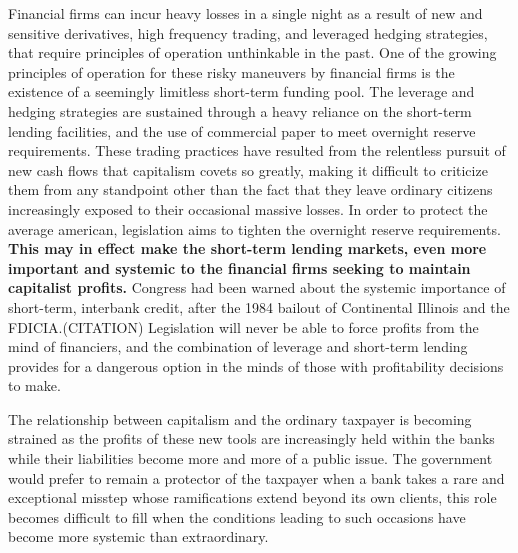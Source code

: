 Financial firms can incur heavy losses in a single night as a result of new and sensitive derivatives, high frequency trading, and leveraged hedging strategies, that require  principles of operation unthinkable in the past.  One of the growing principles of operation for these risky maneuvers by financial firms is the existence of a seemingly limitless short-term funding pool.  The leverage and hedging strategies are sustained through a heavy reliance on the short-term lending facilities, and the use of commercial paper to meet overnight reserve requirements.  These trading practices have resulted from the relentless pursuit of new cash flows that capitalism covets so greatly, making it difficult to criticize them from any standpoint other than the fact that they leave ordinary citizens increasingly exposed to their occasional massive losses.  In order to protect the average american, legislation aims to tighten the overnight reserve requirements.  \textbf{This may in effect make the short-term lending markets, even more important and systemic to the financial firms seeking to maintain capitalist profits.}  Congress had been warned about the systemic importance of short-term, interbank credit, after the 1984 bailout of Continental Illinois and the FDICIA.(CITATION)  Legislation will never be able to force profits from the mind of financiers, and the combination of leverage and short-term lending provides for a dangerous option in the minds of those with profitability decisions to make.  %
%
  
The relationship between capitalism and the ordinary taxpayer is becoming strained as the profits of these new tools are increasingly held within the banks while their liabilities become more and more of a public issue. The government would prefer to remain a protector of the taxpayer when a bank takes a rare and exceptional misstep whose ramifications extend beyond its own clients, this role becomes difficult to fill when the conditions leading to such occasions have become more systemic than extraordinary.

